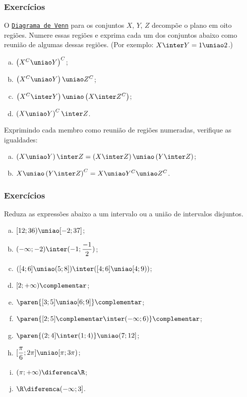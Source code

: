 \begin{frame}
	\frametitle{Exercícios}
	
	\begin{exercicio}
		O \href{https://pt.wikipedia.org/wiki/Diagrama_de_Venn}{{\tt Diagrama de Venn}} para os conjuntos $X$, $Y$, $Z$ decompõe o plano em oito regiões. Numere essas regiões e exprima cada um dos conjuntos abaixo como reunião de algumas dessas regiões.  (Por exemplo: $X \inter Y = 1 \uniao 2$.)
		
		\begin{enumerate}[a.]
			\item $\left(X^C \uniao Y \right)^C$;
			\item $\left(X^C \uniao Y \right) \uniao Z^C$;
			\item $\left(X^C \inter Y \right) \uniao \left(X \inter Z^C \right)$;
			\item $\left(X \uniao Y \right)^C \inter Z$.
		\end{enumerate}
	\end{exercicio}

	\begin{exercicio}
		Exprimindo cada membro como reunião de regiões numeradas, verifique as igualdades:
		\begin{enumerate}[a.]
			\item $\left(X \uniao Y \right)\inter Z = \left(X \inter Z \right) \uniao \left(Y \inter Z
			\right)$;
			\item $X \uniao \left(Y \inter Z \right)^C = X \uniao Y^C \uniao Z^C$.
		\end{enumerate}
	\end{exercicio}
\end{frame}


\begin{frame}
	\frametitle{Exercícios}
	
	\begin{exercicio}
		Reduza as expressões abaixo a um intervalo ou a união de intervalos disjuntos.
		\begin{enumerate}[a.]
			\item $[12; 36) \uniao [-2;37]$;
			\item $(-\infty ; -2) \inter (-1; \dfrac {-1}2)$;
			\item $([4; 6] \uniao (5; 8]) \inter ([4; 6] \uniao [4; 9))$;
			\item $[2; + \infty)\complementar$;
			\item $\paren{[3;5] \uniao [6;9]}\complementar$;
			\item $\paren{[2;5]\complementar \inter (-\infty ; 6)}\complementar$;
			\item $\paren{(2;4] \inter (1;4)} \uniao (7;12]$;
			\item $[\dfrac \pi 6 ; 2 \pi] \uniao [\pi ; 3 \pi)$;
			\item $( \pi ; + \infty) \diferenca \R$;
			\item $\R \diferenca (-\infty ; 3]$.
		\end{enumerate}
	\end{exercicio}
\end{frame}


